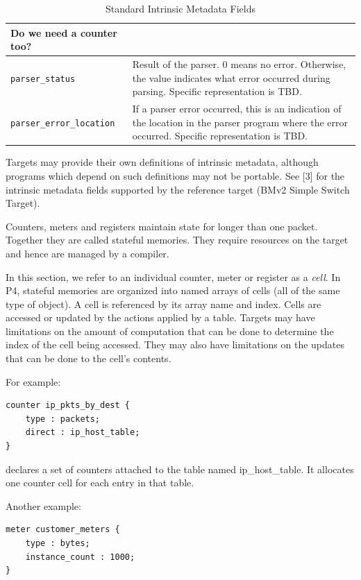 \documentclass[12pt]{article}
\begin{document}
\begin{table}[H]
\begin{center}
\begin{tabular}{| l | p{} |}
Do we need a counter too?  \\ \hline
\texttt{parser_status} &
Result of the parser. 0 means no error. Otherwise, the value indicates what 
error occurred during parsing. Specific representation is TBD. \\ \hline
\texttt{parser_error_location} &
If a parser error occurred, this is an indication of the location in the parser 
program where the error occurred. Specific representation is TBD. \\ \hline
\end{tabular}
\end{center}
\caption{Standard Intrinsic Metadata Fields}
\label{tab:stanmetadata}
\end{table}

Targets may provide their own definitions of intrinsic metadata, although 
programs which depend on such definitions may not be portable. 
See [3] for the intrinsic metadata fields supported by the reference target (BMv2 Simple Switch Target).


Counters, meters and registers maintain state for longer than one packet. 
Together they are called stateful memories. They require resources on the 
target and hence are managed by a compiler.

In this section, we refer to an individual counter, meter or register as a 
\textit{cell}. In P4, stateful memories are organized into named arrays of cells 
(all of the same type of object). A cell is referenced by its array name and 
index. Cells are accessed or updated by the actions applied by a table. Targets 
may have limitations on the amount of computation that can be done to determine 
the index of the cell being accessed.  They may also have limitations on 
the updates that can be done to the cell's contents.

For example:

\begin{lstlisting}[keywords={},frame=single,escapechar=\@]
counter ip_pkts_by_dest {
    type : packets;
    direct : ip_host_table;
}
\end{lstlisting}


declares a set of counters attached to the table named ip_host_table. It 
allocates one counter cell for each entry in that table.

Another example:

\begin{lstlisting}[keywords={},frame=single,escapechar=\@]
meter customer_meters {
    type : bytes;
    instance_count : 1000;
}
\end{lstlisting}
\end{document}
